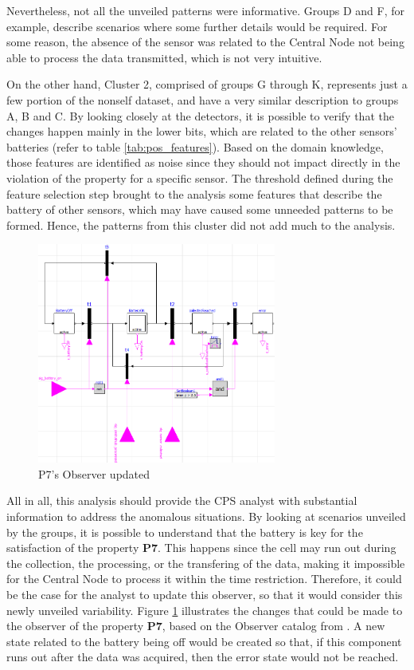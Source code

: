Nevertheless, not all the unveiled patterns were informative. Groups D and F, for example, describe scenarios where some further details would be required. For some reason, the absence of the sensor was related to the Central Node not being able to process the data transmitted, which is not very intuitive.

On the other hand, Cluster 2, comprised of groups G through K, represents just a few portion of the nonself dataset, and have a very similar description to groups A, B and C. By looking closely at the detectors, it is possible to verify that the changes happen mainly in the lower bits, which are related to the other sensors' batteries (refer to table \ref{tab:pos_features}). Based on the domain knowledge, those features are identified as noise since they should not impact directly in the violation of the property for a specific sensor. The threshold defined during the feature selection step brought to the analysis some features that describe the battery of other sensors, which may have caused some unneeded patterns to be formed. Hence, the patterns from this cluster did not add much to the analysis.

\begin{figure}[]
	\centering
	\includegraphics[width=0.7\textwidth, keepaspectratio]{img/observer_fxd.png}
	\caption{P7's Observer updated}
	\label{fig:ev_observer_fxd}
\end{figure}

All in all, this analysis should provide the CPS analyst with substantial information to address the anomalous situations. By looking at scenarios unveiled by the groups, it is possible to understand that the battery is key for the satisfaction of the property \textbf{P7}. This happens since the cell may run out during the collection, the processing, or the transfering of the data, making it impossible for the Central Node to process it within the time restriction. Therefore, it could be the case for the analyst to update this observer, so that it would consider this newly unveiled variability. Figure \ref{fig:ev_observer_fxd} illustrates the changes that could be made to the observer of the property \textbf{P7}, based on the Observer catalog from \cite{2022PSP}. A new state related to the battery being off would be created so that, if this component runs out after the data was acquired, then the error state would not be reached.


